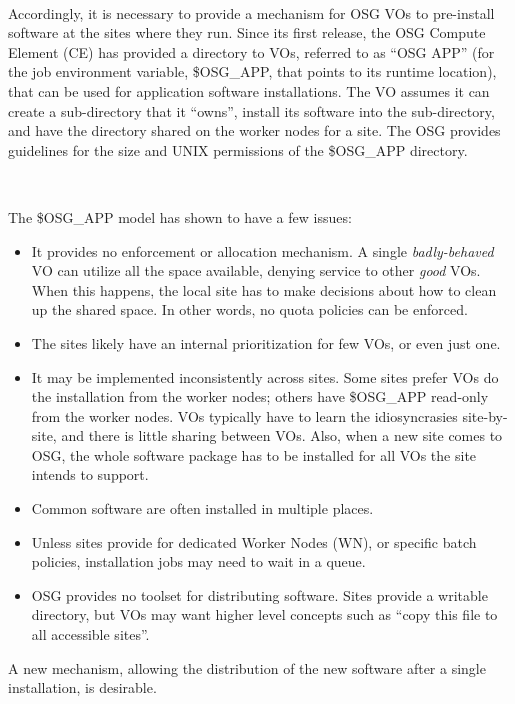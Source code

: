 \documentclass[a4paper]{jpconf}
\begin{document}
~

Accordingly, it is necessary to provide a mechanism for OSG VOs to pre-install software at the sites where they run.
Since its first release, the OSG Compute Element (CE) has provided a directory to VOs, referred to as ``OSG APP'' 
(for the job environment variable, \$OSG\_APP, that points to its runtime location), 
that can be used for application software installations.  
The VO assumes it can create a sub-directory that it “owns”, 
install its software into the sub-directory, and have the directory shared on the worker nodes for a site. 
The OSG provides guidelines for the size and UNIX permissions of the \$OSG\_APP directory.

~

The \$OSG\_APP model has shown to have a few issues:

\begin{itemize} 
\item It provides no enforcement or allocation mechanism.  
      A single \textit{badly-behaved} VO can utilize all the space available, 
      denying service to other \textit{good} VOs.  
      When this happens, the local site has to make decisions about how to clean up the shared space.
      In other words, no quota policies can be enforced.
\item The sites likely have an internal prioritization for few VOs, or even just one. 
\item It may be implemented inconsistently across sites.  
      Some sites prefer VOs do the installation from the worker nodes; 
      others have \$OSG\_APP read-only from the worker nodes.  
      VOs typically have to learn the idiosyncrasies site-by-site, and there is little sharing between VOs.
      Also, when a new site comes to OSG, the whole software package has to be installed for all VOs the site intends to support.
\item Common software are often installed in multiple places.
\item Unless sites provide for dedicated Worker Nodes (WN), or specific batch policies,
      installation jobs may need to wait in a queue.
\item OSG provides no toolset for distributing software.  
      Sites provide a writable directory, 
      but VOs may want higher level concepts such as ``copy this file to all accessible sites''.
\end{itemize} 

A new mechanism, allowing the distribution of the new software after a single
installation, is desirable.
\end{document}
